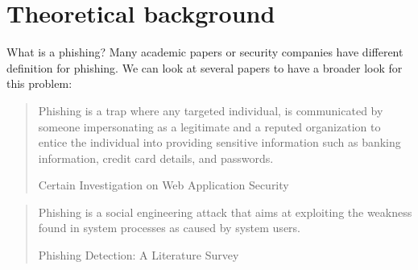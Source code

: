 \documentclass[
  digital, %
  oneside, %
  table,   %
  nolof,     %
  nolot,     %
]{fithesis3}
\begin{document}








\chapter{Theoretical background}

What is a phishing? Many academic papers or security companies have different definition for phishing. We can look at several papers to have a broader look for this problem:

\blockquote[Certain Investigation on Web Application Security \cite{certain-investigation}][]{
Phishing    is    a    trap    where    any    targeted    individual,    is    communicated  by  someone  impersonating  as  a  legitimate  and  a  reputed  organization  to  entice  the  individual  into  providing  sensitive information such as banking information, credit card details, and  passwords.
}

\par

\blockquote[Phishing Detection: A Literature Survey \cite{literature-survey}][]{
\par Phishing is a social engineering attack that aims at exploiting the weakness found in system processes as caused by system users.
}
\end{document}
